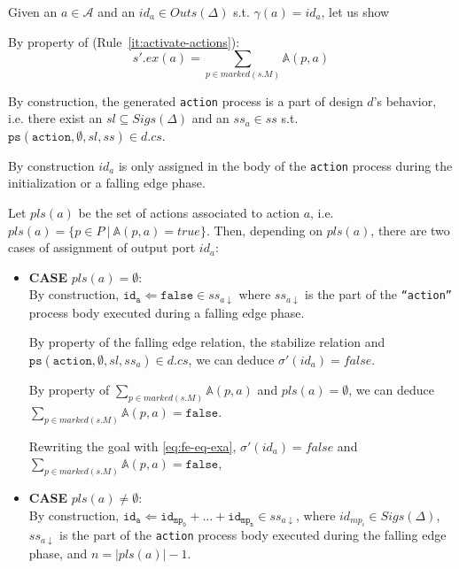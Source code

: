 \documentclass[dvipsnames,12pt]{article}
\begin{document}
\begin{niproof}
  Given an $a\in\mathcal{A}$ and an $id_a\in{}Outs(\Delta)$
  s.t. $\gamma(a)=id_a$, let us show 

  \noindent{}By property of \dwSitpn (Rule~\ref{it:activate-actions}):
  \begin{equation}
    s'.ex(a)=\sum\limits_{p\in{}marked(s.M)}\mathbb{A}(p,a)\label{eq:fe-eq-exa}
  \end{equation}
  
  By construction, the generated \texttt{action} process is a part of
  design $d$'s behavior, i.e. there exist an
  $sl\subseteq{}Sigs(\Delta)$ and an $ss_a\in{}ss$ s.t.
  $\mathtt{ps}(\texttt{action}, \emptyset, sl, ss)\in{}d.cs$.
  
  By construction $id_a$ is only assigned in the body of the
  \texttt{action} process during the initialization or a falling edge
  phase.

  Let $pls(a)$ be the set of actions associated to action $a$, i.e.
  $pls(a)=\{p\in{}P~\vert~\mathbb{A}(p,a)=true\}$. Then, depending on
  $pls(a)$, there are two cases of assignment of output port $id_a$:
  
  \begin{itemize}
  \item \textbf{CASE} $pls(a)=\emptyset$:\\
    \noindent{}By construction,
    $\mathtt{id_a\Leftarrow{}false}\in{}ss_{a\downarrow}$ where
    $ss_{a\downarrow}$ is the part of the \texttt{``action''} process
    body executed during a falling edge phase.

    \noindent{}By property of the \hvhdl{} falling edge relation, the
    stabilize relation and\\
    $\mathtt{ps}(\texttt{action}, \emptyset, sl, ss_a)\in{}d.cs$, we can
    deduce $\sigma'(id_a)=false$.
    
    \noindent{}By property of
    $\sum\limits_{p\in{}marked(s.M)}\mathbb{A}(p,a)$ and
    $pls(a)=\emptyset$, we can deduce
    $\sum\limits_{p\in{}marked(s.M)}\mathbb{A}(p,a)=\mathtt{false}$.

    \noindent{}Rewriting the goal with \eqref{eq:fe-eq-exa},
    $\sigma'(id_a)=false$ and
    $\sum\limits_{p\in{}marked(s.M)}\mathbb{A}(p,a)=\mathtt{false}$,
    
  \item \textbf{CASE} $pls(a)\neq\emptyset$:\\
    \noindent{}By construction,
    $\mathtt{id_a\Leftarrow{}id_{mp_0}+\dots+id_{mp_n}}\in{}ss_{a\downarrow}$,
    where $id_{mp_i}\in{}Sigs(\Delta)$, $ss_{a\downarrow}$ is the part
    of the \texttt{action} process body executed during the falling
    edge phase, and $n=\vert{}pls(a)\vert-1$.


\end{itemize}
\end{niproof}
\end{document}
